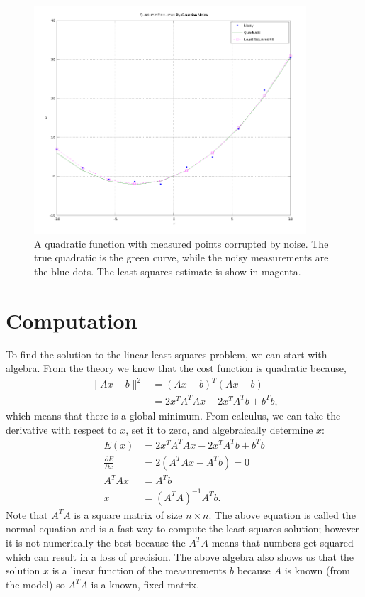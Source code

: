 \documentclass{article}
\begin{document}
\begin{figure}
\centering
\includegraphics[width=4in]{example.png}
\caption{A quadratic function with measured points corrupted by noise.  The true quadratic is the green curve, while the noisy measurements are the blue dots.  The least squares estimate is show in magenta.}
\label{fig:example}
\end{figure}

\section{Computation}

To find the solution to the linear least squares problem, we can start with algebra.  From the theory we know that the cost function is quadratic because,
\begin{align}
\lVert{Ax - b}\rVert^2 &= (Ax - b)^T (Ax - b) \\
&= 2 x^T A^T A x -2 x^T A^T b + b^T b,
\end{align}
which means that there is a global minimum.
From calculus, we can take the derivative with respect to $x$, set it to zero, and algebraically determine $x$:
\begin{align}
E(x) &= 2 x^T A^T A x -2 x^T A^T b + b^T b \\
\frac{\partial E}{\partial x} &= 2 (A^T A x - A^T b) = 0 \\
A^T A x &= A^T b \\
x &= (A^T A)^{-1} A^T b.
\end{align}
Note that $A^T A$ is a square matrix of size $n \times n$.  The above equation is called the normal equation and is a fast way to compute the least squares solution; however it is not numerically the best because the $A^T A$ means that numbers get squared which can result in a loss of precision.  The above algebra also shows us that the solution $x$ is a linear function of the measurements $b$ because $A$ is known (from the model) so $A^T A$ is a known, fixed matrix.
\end{document}
